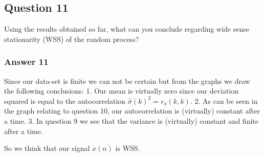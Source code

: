 \documentclass[11pt]{article}
\begin{document}
    \hypertarget{question-11}{%
\subsection{Question 11}\label{question-11}}

Using the results obtained so far, what can you conclude regarding wide
sense stationarity (WSS) of the random process?

    \hypertarget{answer-11}{%
\subsubsection{Answer 11}\label{answer-11}}

Since our data-set is finite we can not be certain but from the graphs
we draw the following conclusions: 1. Our mean is virtually zero since
our deviation squared is equal to the autocorrelation
\(\hat{\sigma}(k)^2 = r_x(k,k)\). 2. As can be seen in the graph
relating to question 10, our autocorrelation is (virtually) constant
after a time. 3. In question 9 we see that the variance is (virtually)
constant and finite after a time.

So we think that our signal \(x(n)\) is WSS.


    
    
    
\end{document}
